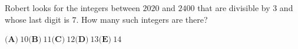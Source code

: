 Robert looks for the integers between $2020$ and $2400$ that are divisible by $3$ and whose last digit is $7$. How many such integers are there?

$\textbf{(A)}\ 10$\qquad$\textbf{(B)}\ 11$\qquad$\textbf{(C)}\ 12$\qquad$\textbf{(D)}\ 13$\qquad$\textbf{(E)}\ 14$

